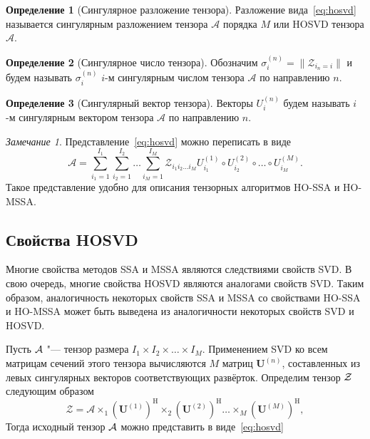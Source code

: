 \documentclass[specialist,
  substylefile=spbu_report.rtx,
subf,href,colorlinks=true, 12pt]{disser}
\theoremstyle{plain}
\theoremstyle{definition}
\newtheorem{definition}{Определение}[section]
\theoremstyle{remark}
\newtheorem{remark}{Замечание}[section]
\begin{document}
\begin{definition}[Сингулярное разложение тензора]
  \label{def:hosvd}
  Разложение вида~\eqref{eq:hosvd} называется сингулярным разложением
  тензора $\mathcal{A}$ порядка $M$ или
  HOSVD тензора $\mathcal{A}$.
\end{definition}
\begin{definition}[Сингулярное число тензора]
  \label{def:singular-value}
  Обозначим $\sigma_i^{(n)}=\|\mathcal Z_{i_n=i}\|$ и будем называть
  $\sigma_i^{(n)}$ $i$-м сингулярным числом
  тензора $\mathcal A$ по направлению $n$.
\end{definition}
\begin{definition}[Сингулярный вектор тензора]
  \label{def:singular-tensor}
  Векторы $U_i^{(n)}$ будем называть $i$-м сингулярным вектором
  тензора $\mathcal A$ по направлению $n$.
\end{definition}
\begin{remark}
  Представление~\eqref{eq:hosvd} можно переписать в виде
  \begin{equation}
    \mathcal{A}=\sum_{i_1=1}^{I_1} \sum_{i_2=1}^{I_2}\ldots
    \sum_{i_M=1}^{I_M} \mathcal{Z}_{i_1 i_2 \ldots i_M}
    U^{(1)}_{i_1} \circ U^{(2)}_{i_2} \circ \ldots\circ
    U^{(M)}_{i_M}.\label{eq:sum-hosvd}
  \end{equation}
  Такое представление удобно для описания тензорных алгоритмов HO-SSA
  и HO-MSSA\@.
\end{remark}

\subsection{Свойства HOSVD}\label{subsec:hosvd-properties}
Многие свойства методов SSA и MSSA являются следствиями свойств SVD\@.
В свою очередь, многие свойства HOSVD являются аналогами свойств SVD\@.
Таким образом, аналогичность некоторых свойств SSA и MSSA со
свойствами HO-SSA и HO-MSSA
может быть выведена из аналогичности некоторых свойств SVD и HOSVD\@.

Пусть $\mathcal{A}$ "--- тензор размера $I_1\times I_2\times\ldots\times I_M$.
Применением SVD ко всем матрицам сечений этого тензора вычисляются
$M$ матриц $\mathbf{U}^{(n)}$,
составленных из левых сингулярных векторов соответствующих развёрток.
Определим тензор $\mathcal{Z}$ следующим образом
\[
  \mathcal{Z}=\mathcal{A}\times_1
  \left(\mathbf{U}^{(1)}\right)^\mathrm{H}\times_2
  \left(\mathbf{U}^{(2)}\right)^\mathrm{H}\ldots \times_M
  \left(\mathbf{U}^{(M)}\right)^\mathrm{H},
\]
Тогда исходный тензор $\mathcal{A}$ можно представить в виде~\eqref{eq:hosvd}
\end{document}

